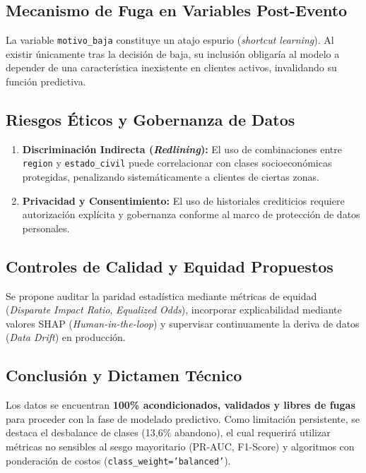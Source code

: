 \documentclass[12pt,a4paper]{article}
\begin{document}
\subsection{Mecanismo de Fuga en Variables Post-Evento}
La variable \texttt{motivo\_baja} constituye un atajo espurio (\textit{shortcut learning}). Al existir únicamente tras la decisión de baja, su inclusión obligaría al modelo a depender de una característica inexistente en clientes activos, invalidando su función predictiva.

\subsection{Riesgos Éticos y Gobernanza de Datos}
\begin{enumerate}[noitemsep]
    \item \textbf{Discriminación Indirecta (\textit{Redlining}):} El uso de combinaciones entre \texttt{region} y \texttt{estado\_civil} puede correlacionar con clases socioeconómicas protegidas, penalizando sistemáticamente a clientes de ciertas zonas.
    \item \textbf{Privacidad y Consentimiento:} El uso de historiales crediticios requiere autorización explícita y gobernanza conforme al marco de protección de datos personales.
\end{enumerate}

\subsection{Controles de Calidad y Equidad Propuestos}
Se propone auditar la paridad estadística mediante métricas de equidad (\textit{Disparate Impact Ratio}, \textit{Equalized Odds}), incorporar explicabilidad mediante valores SHAP (\textit{Human-in-the-loop}) y supervisar continuamente la deriva de datos (\textit{Data Drift}) en producción.

\subsection{Conclusión y Dictamen Técnico}
Los datos se encuentran \textbf{100\% acondicionados, validados y libres de fugas} para proceder con la fase de modelado predictivo. Como limitación persistente, se destaca el desbalance de clases (13,6\% abandono), el cual requerirá utilizar métricas no sensibles al sesgo mayoritario (PR-AUC, F1-Score) y algoritmos con ponderación de costos (\texttt{class\_weight='balanced'}).
\end{document}
